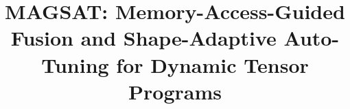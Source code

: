 \documentclass[sigconf,review, anonymous]{acmart}
\begin{document}
\title{MAGSAT: Memory-Access-Guided Fusion and Shape-Adaptive Auto-Tuning for Dynamic Tensor Programs}


%
%
%
%
%
%

\end{document}
